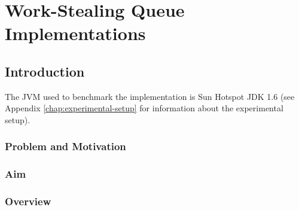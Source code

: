
\part{Work-Stealing Queue Implementations}
\label{part:queues}

\chapter{Introduction}
\label{chap:queues-introduction}

The JVM used to benchmark the implementation is Sun Hotspot JDK 1.6
(see Appendix \ref{chap:experimental-setup} for information about the
experimental setup).

\section{Problem and Motivation}
\label{sec:queues-intro-problem-and-motivation}


\section{Aim}
\label{sec:queues-intro-aim}


\section{Overview}
\label{sec:queues-intro-overview}


